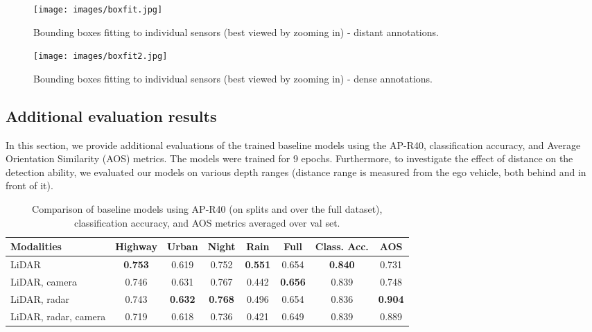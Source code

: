 \documentclass{article}
\begin{document}
\begin{figure}[H]
  \centering
    \texttt{[image: images/boxfit.jpg]}

   \caption{Bounding boxes fitting to individual sensors (best viewed by zooming in) - distant annotations.}
   \label{fig:boxfit}
\end{figure}

\begin{figure}[H]
  \centering
    \texttt{[image: images/boxfit2.jpg]}

   \caption{Bounding boxes fitting to individual sensors (best viewed by zooming in) - dense annotations.}
   \label{fig:boxfit2}
\end{figure}

\subsection{Additional evaluation results}
In this section, we provide additional evaluations of the trained baseline models using the AP-R40, classification accuracy, and Average Orientation Similarity (AOS) metrics. The models were trained for 9 epochs. Furthermore, to investigate the effect of distance on the detection ability, we evaluated our models on various depth ranges (distance range is measured from the ego vehicle, both behind and in front of it).

\begin{table*}[!h]
  \small
  \centering
  \begin{tabular}{@{}l|ccccccc@{}}
    \toprule
    Modalities          & Highway   & Urban     & Night     & Rain      & Full      & Class. Acc.   & AOS\\
    \midrule
    LiDAR               & \bf{0.753}& 0.619     & 0.752     & \bf{0.551}& 0.654     & \bf{0.840}    & 0.731 \\
    LiDAR, camera       & 0.746     & 0.631     & 0.767     & 0.442     & \bf{0.656}& 0.839         & 0.748 \\
    LiDAR, radar        & 0.743     & \bf{0.632}& \bf{0.768}& 0.496     & 0.654     & 0.836         & \bf{0.904} \\
    LiDAR, radar, camera & 0.719    & 0.618     & 0.736     & 0.421     & 0.649     & 0.839         & 0.889 \\
    \bottomrule
  \end{tabular}
  \caption{Comparison of baseline models using AP-R40 (on splits and over the full dataset), classification accuracy, and AOS metrics averaged over val set.}
  \label{tab:metrics_whole}
\end{table*}
\end{document}
